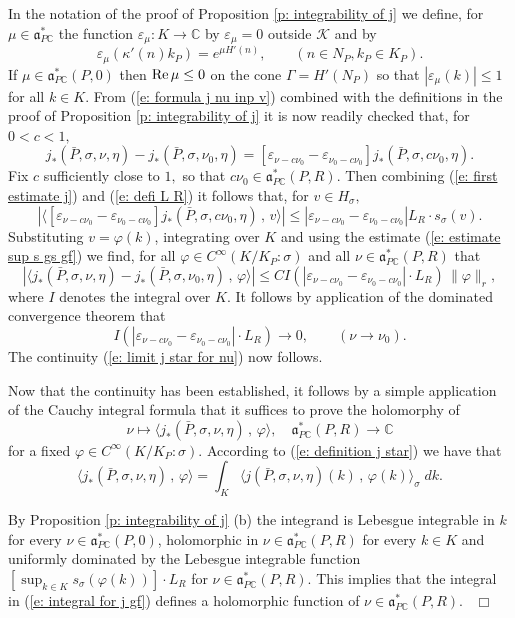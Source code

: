 \documentclass[12pt,a4paper]{article}
\def\qed{~\hfill\hbox{$\Box$}\medbreak}
\def\qquad{\quad\quad}
\def\msy#1{{\mathbb #1}}
\def\C{{\msy C}}
\def\ge{\varepsilon}
\def\gf{\varphi}
\def\gs{\sigma}
\def\got#1{\mathfrak #1}
\def\fa{{\got a}}
\def\to{\rightarrow}
\def\Re{{\rm Re}\,}
\def\inp#1#2{\langle#1\,,\,#2\rangle}
\def\iC{{\scriptscriptstyle \C}}
\def\cK{{\mathcal K}}
\numberwithin{Thm}{section}
\numberwithin{equation}{section}
\def\faPdc{{\fa_{P\iC}^*}}
\numberwithin{equation}{section}
\def\faPdc{\fa_{P\iC}^*}
\def\gsP{\gs}%
\begin{document}
In the notation of the proof of Proposition \ref{p: integrability of j} we define, for $\mu \in \faPdc$ the function 
$\ge_\mu: K \to \C$ by $\ge_\mu= 0$ outside $\cK$ and by 
$$ 
\ge_\mu(\kappa'(n) k_P)= e^{\mu H'(n)} , \qquad (n \in N_P, k_P \in K_P).
$$%
If $\mu \in \faPdc(P,0)$ then $\Re \mu \leq 0$ on the cone $\Gamma = H'(N_P)$ so that
$|\ge_\mu(k)| \leq 1$ for all $k \in K.$ From (\ref{e: formula j nu inp v}) combined with 
the definitions in the proof of Proposition \ref{p: integrability of j} it is now readily checked that, for $0 < c < 1,$
$$ 
j_*(\bar P, \gs, \nu, \eta) - j_*(\bar P, \gs, \nu_0, \eta) = \left[ \ge_{\nu - c \nu_0} - \ge_{\nu_0 - c \nu_0}
\right] j_*(\bar P, \gs, c \nu_0, \eta).
$$%
Fix $c$ sufficiently close to $1,$ so that $c \nu_0 \in \faPdc(P, R).$ 
%
Then combining (\ref{e: first estimate j}) and (\ref{e: defi L R}) it follows that,
for $v \in H_\gs,$ 
$$
|\inp{\left[ \ge_{\nu - c \nu_0} - \ge_{\nu_0 - c \nu_0}
\right] j_*(\bar P, \gs, c \nu_0, \eta)}{v} | \leq \left|\ge_{\nu - c \nu_0} - \ge_{\nu_0 - c \nu_0}
\right|  L_R \cdot s_{\gs}(v).
$$%
Substituting $v = \gf(k)$, integrating over $K$ and using the estimate (\ref{e: estimate sup s gs gf}) we find,
%
 for all $\gf \in C^\infty(K/K_P: \gs)$ and all $\nu \in \faPdc(P, R)$ that 
$$ 
|\inp{j_*(\bar P, \gs, \nu, \eta) - j_*(\bar P, \gs, \nu_0, \eta) }{\gf}|
\leq 
C I(|\ge_{\nu - c \nu_0} - \ge_{\nu_0 - c \nu_0}| \cdot L_R) \, \|\gf\|_{r},
$$%
%
where $I$ denotes the integral over $K.$ It  
follows by application of the dominated convergence theorem that 
$$ 
I(|\ge_{\nu - c \nu_0} - \ge_{\nu_0 - c \nu_0}|\cdot L_R) \to 0 , \qquad (\nu \to \nu_0).
$$%
The continuity (\ref{e: limit j  star for nu}) now follows. 

Now that the continuity has been established, it follows by a simple application 
of the Cauchy integral formula that it suffices to prove the holomorphy of  
\begin{equation}
\label{e: holomorphy of j map}
\nu \mapsto \inp{j_*(\bar P, \gs, \nu,\eta)}{\gf}, \quad \faPdc(P,R) \to \C
\end{equation}
for a fixed $\gf \in C^\infty(K/K_P:\gsP).$ 
%
According to (\ref{e: definition j star}) we have that 
\begin{equation}
\label{e: integral for j gf}
\inp{j_*(\bar P, \gs, \nu, \eta)}{\gf}  = \int_K  \inp{ j(\bar P,\gs, \nu, \eta)(k)}{\gf(k)}_\gs \; dk.
\end{equation}

By Proposition \ref{p: integrability of j} (b) the integrand is Lebesgue integrable in $k$ for every 
$\nu \in \faPdc(P,0)$, holomorphic in $\nu \in \faPdc(P,R)$ for every $k \in K$ and uniformly dominated by the  Lebesgue integrable function 
$[\sup_{k \in K} s_\gs(\gf(k))] \cdot L_R$ for $\nu \in \faPdc(P,R).$ This implies   
that the integral in (\ref{e: integral for j gf}) defines a holomorphic function of $\nu \in \faPdc(P,R).$ 
\qed
\end{document}
